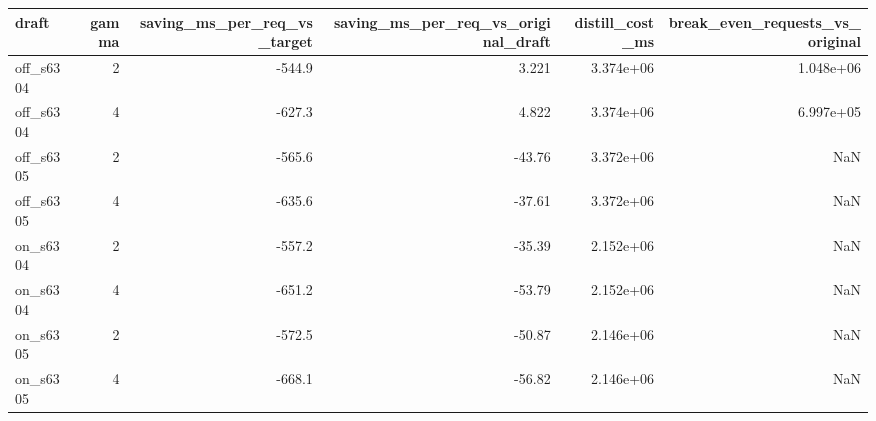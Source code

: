 \begin{table}
\label{tab:task3_deployment_break_even}
\begin{tabular}{lrrrrr}
\toprule
draft & gamma & saving\_ms\_per\_req\_vs\_target & saving\_ms\_per\_req\_vs\_original\_draft & distill\_cost\_ms & break\_even\_requests\_vs\_original \\
\midrule
off\_s6304 & 2 & -544.9 & 3.221 & 3.374e+06 & 1.048e+06 \\
off\_s6304 & 4 & -627.3 & 4.822 & 3.374e+06 & 6.997e+05 \\
off\_s6305 & 2 & -565.6 & -43.76 & 3.372e+06 & NaN \\
off\_s6305 & 4 & -635.6 & -37.61 & 3.372e+06 & NaN \\
on\_s6304 & 2 & -557.2 & -35.39 & 2.152e+06 & NaN \\
on\_s6304 & 4 & -651.2 & -53.79 & 2.152e+06 & NaN \\
on\_s6305 & 2 & -572.5 & -50.87 & 2.146e+06 & NaN \\
on\_s6305 & 4 & -668.1 & -56.82 & 2.146e+06 & NaN \\
\bottomrule
\end{tabular}
\end{table}

